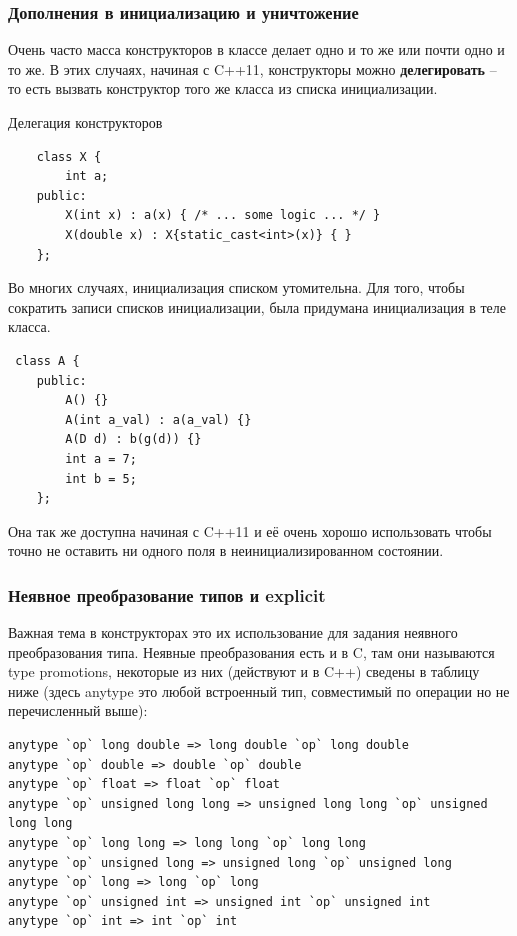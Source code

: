 \documentclass[a4paper,12pt,oneside]{article}
\begin{document}
\subsubsection{Дополнения в инициализацию и уничтожение}\label{ConstrDestrAddition}

Очень часто масса конструкторов в классе делает одно и то же или почти одно и то же. В этих случаях, начиная с C++11, конструкторы можно \textbf{делегировать} -- то есть вызвать конструктор того же класса из списка инициализации.

Делегация конструкторов

\begin{lstlisting}
    class X {
        int a;
    public:
        X(int x) : a(x) { /* ... some logic ... */ }
        X(double x) : X{static_cast<int>(x)} { }
    };
\end{lstlisting}

Во многих случаях, инициализация списком утомительна. Для того, чтобы сократить записи списков инициализации, была придумана инициализация в теле класса.

\begin{lstlisting}
 class A {
    public:
        A() {}
        A(int a_val) : a(a_val) {}
        A(D d) : b(g(d)) {}
        int a = 7;
        int b = 5;  
    };
\end{lstlisting}

Она так же доступна начиная с C++11 и её очень хорошо использовать чтобы точно не оставить ни одного поля в неинициализированном состоянии.

\subsubsection{Неявное преобразование типов и explicit}\label{Explicit}

Важная тема в конструкторах это их использование для задания неявного преобразования типа. Неявные преобразования есть и в C, там они называются type promotions, некоторые из них (действуют и в C++) сведены в таблицу ниже (здесь anytype это любой встроенный тип, совместимый по операции но не перечисленный выше):

\begin{lstlisting}
anytype `op` long double => long double `op` long double
anytype `op` double => double `op` double
anytype `op` float => float `op` float
anytype `op` unsigned long long => unsigned long long `op` unsigned long long
anytype `op` long long => long long `op` long long
anytype `op` unsigned long => unsigned long `op` unsigned long
anytype `op` long => long `op` long
anytype `op` unsigned int => unsigned int `op` unsigned int
anytype `op` int => int `op` int
\end{lstlisting}
\end{document}
